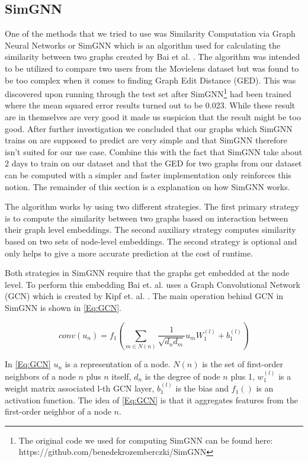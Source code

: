 \subsection{SimGNN}\label{AP:SimGNN}
One of the methods that we tried to use was Similarity Computation via Graph Neural Networks or SimGNN which is an algorithm used for calculating the similarity between two graphs created by Bai et al. \cite{Bai2018}. The algorithm was intended to be utilized to compare two users from the Movielens dataset but was found to be too complex when it comes to finding Graph Edit Distance (GED). This was discovered upon running through the test set after SimGNN\footnote{The original code we used for computing SimGNN can be found here: https://github.com/benedekrozemberczki/SimGNN} had been trained where the mean squared error results turned out to be 0.023. While these result are in themselves are very good it made us suspicion that the result might be too good. After further investigation we concluded that our graphs which SimGNN trains on are supposed to predict are very simple and that SimGNN therefore isn't suited for our use case. Combine this with the fact that SimGNN take about 2 days to train on our dataset and that the GED for two graphs from our dataset can be computed with a simpler and faster implementation only reinforces this notion. The remainder of this section is a explanation on how SimGNN works.

The algorithm works by using two different strategies. The first primary strategy is to compute the similarity between two graphs based on interaction between their graph level embeddings. The second auxiliary strategy computes similarity based on two sets of node-level embeddings. The second strategy is optional and only helps to give a more accurate prediction at the cost of runtime\cite{Bai2018}.

Both strategies in SimGNN require that the graphs get embedded at the node level. To perform this embedding Bai et. al. uses a Graph Convolutional Network (GCN)\cite{Bai2018} which is created by Kipf et. al. \cite{Kipf2016}. The main operation behind GCN in SimGNN is shown in \autoref{Eq:GCN}.


\begin{equation}\label{Eq:GCN}
conv(u_n)=f_1(\sum_{m \in N(n)} \frac{1}{\sqrt{d_nd_m}}u_mW_1^{(l)}+b_1^{(l)})
\end{equation}

In \autoref{Eq:GCN} $u_n$ is a representation of a node. $N(n)$ is the set of first-order neighbors of a node $n$ plus $n$ itself, $d_n$ is the degree of node $n$ plus 1, $w_1^{(l)}$ is a weight matrix associated l-th GCN layer, $b_1^{(l)}$ is the bias and $f_1()$ is an activation function. The idea of \autoref{Eq:GCN} is that it aggregates features from the first-order neighbor of a node $n$\cite{Bai2018}.

